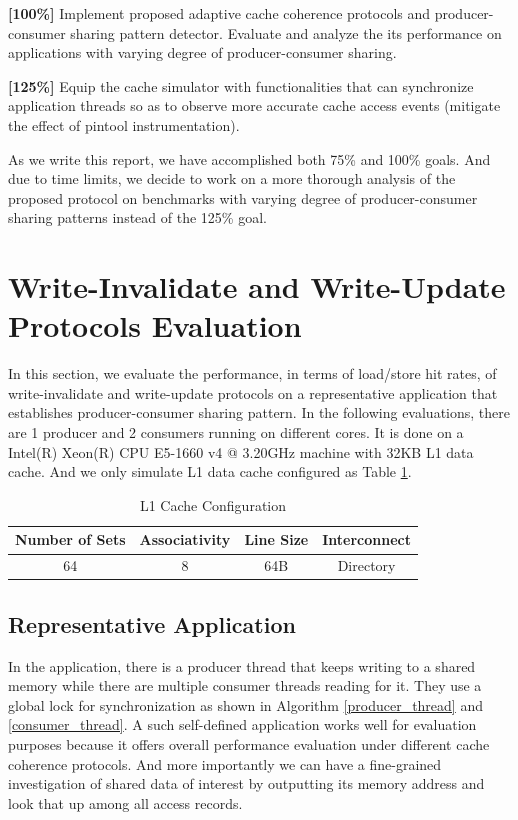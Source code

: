 \documentclass[11pt,conference]{IEEEtran}
\begin{document}
\textbf{[100\%]} Implement proposed adaptive cache coherence protocols and producer-consumer sharing pattern detector. Evaluate and analyze the its performance on applications with varying degree of producer-consumer sharing.

\textbf{[125\%]} Equip the cache simulator with functionalities that can synchronize application threads so as to observe more accurate cache access events (mitigate the effect of pintool instrumentation).

As we write this report, we have accomplished both 75\% and 100\% goals. And due to time limits, we decide to work on a more thorough analysis of the proposed protocol on benchmarks with varying degree of producer-consumer sharing patterns instead of the 125\% goal.


\section{Write-Invalidate and Write-Update Protocols Evaluation}
In this section, we evaluate the performance, in terms of load/store hit rates, of write-invalidate and write-update protocols on a representative application that establishes producer-consumer sharing pattern. In the following evaluations, there are 1 producer and 2 consumers running on different cores. It is done on a Intel(R) Xeon(R) CPU E5-1660 v4 @ 3.20GHz machine with 32KB L1 data cache. And we only simulate L1 data cache configured as Table \ref{l1_cache_config_1}.

\begin{table}[!h]
\renewcommand{\arraystretch}{2.5}
\caption{L1 Cache Configuration}
\label{l1_cache_config_1}
\centering
\begin{tabular}{|c|c|c|c|}
\hline
Number of Sets & Associativity & Line Size & Interconnect \\
\hline
64 & 8 & 64B & Directory \\
\hline
\end{tabular}
\end{table}
\FloatBarrier

\subsection{Representative Application}
In the application, there is a producer thread that keeps writing to a shared memory while there are multiple consumer threads reading for it. They use a global lock for synchronization as shown in Algorithm \ref{producer_thread} and \ref{consumer_thread}. A such self-defined application works well for evaluation purposes because it offers overall performance evaluation under different cache coherence protocols. And more importantly we can have a fine-grained investigation of shared data of interest by outputting its memory address and look that up among all access records.
\end{document}
